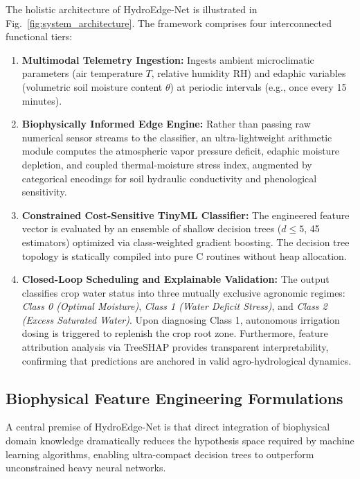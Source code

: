 The holistic architecture of HydroEdge-Net is illustrated in Fig.~\ref{fig:system_architecture}. The framework comprises four interconnected functional tiers:
\begin{enumerate}
    \item \textbf{Multimodal Telemetry Ingestion:} Ingests ambient microclimatic parameters (air temperature $T$, relative humidity $\text{RH}$) and edaphic variables (volumetric soil moisture content $\theta$) at periodic intervals (e.g., once every 15 minutes).
    \item \textbf{Biophysically Informed Edge Engine:} Rather than passing raw numerical sensor streams to the classifier, an ultra-lightweight arithmetic module computes the atmospheric vapor pressure deficit, edaphic moisture depletion, and coupled thermal-moisture stress index, augmented by categorical encodings for soil hydraulic conductivity and phenological sensitivity.
    \item \textbf{Constrained Cost-Sensitive TinyML Classifier:} The engineered feature vector is evaluated by an ensemble of shallow decision trees ($d \le 5$, 45 estimators) optimized via class-weighted gradient boosting. The decision tree topology is statically compiled into pure C routines without heap allocation.
    \item \textbf{Closed-Loop Scheduling and Explainable Validation:} The output classifies crop water status into three mutually exclusive agronomic regimes: \textit{Class 0 (Optimal Moisture)}, \textit{Class 1 (Water Deficit Stress)}, and \textit{Class 2 (Excess Saturated Water)}. Upon diagnosing Class 1, autonomous irrigation dosing is triggered to replenish the crop root zone. Furthermore, feature attribution analysis via TreeSHAP provides transparent interpretability, confirming that predictions are anchored in valid agro-hydrological dynamics.
\end{enumerate}

\subsection{Biophysical Feature Engineering Formulations}

A central premise of HydroEdge-Net is that direct integration of biophysical domain knowledge dramatically reduces the hypothesis space required by machine learning algorithms, enabling ultra-compact decision trees to outperform unconstrained heavy neural networks.

